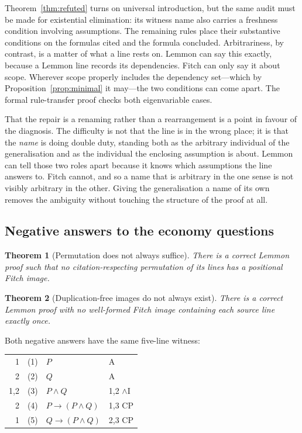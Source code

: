 \documentclass[11pt]{article}
\makeatletter
\theoremstyle{plain}
\newtheorem{theorem}{Theorem}
\theoremstyle{definition}
\theoremstyle{remark}
\newcommand{\dep}[1]{\textup{#1}}
\newenvironment{lemmonproof}
  {\begin{center}\begin{tabular}{@{}r@{\hspace{1.5em}}r@{\hspace{0.6em}}l@{\hspace{2.5em}}l@{}}}
  {\end{tabular}\end{center}}
\makeatother
\begin{document}
Theorem~\ref{thm:refuted} turns on universal introduction, but the same audit
must be made for existential elimination: its witness name also carries a
freshness condition involving assumptions. The remaining rules place their
substantive conditions on the formulas cited and the formula concluded.
Arbitrariness, by contrast, is a matter of what a line rests on. Lemmon can
say this exactly, because a Lemmon line records its dependencies. Fitch can
only say it about scope. Wherever scope properly includes the dependency
set---which by Proposition~\ref{prop:minimal} it may---the two conditions can
come apart. The formal rule-transfer proof checks both eigenvariable cases.

That the repair is a renaming rather than a rearrangement is a point in
favour of the diagnosis. The difficulty is not that the line is in the wrong
place; it is that the \emph{name} is doing double duty, standing both as the
arbitrary individual of the generalisation and as the individual the enclosing
assumption is about. Lemmon can tell those two roles apart because it knows
which assumptions the line answers to. Fitch cannot, and so a name that is
arbitrary in the one sense is not visibly arbitrary in the other. Giving the
generalisation a name of its own removes the ambiguity without touching the
structure of the proof at all.

\subsection{Negative answers to the economy questions}

\begin{theorem}[Permutation does not always suffice]\label{conj:reorder}
There is a correct Lemmon proof such that no citation-respecting permutation
of its lines has a positional Fitch image.
\end{theorem}

\begin{theorem}[Duplication-free images do not always exist]
\label{conj:noduplication}
There is a correct Lemmon proof with no well-formed Fitch image containing
each source line exactly once.
\end{theorem}

Both negative answers have the same five-line witness:

\begin{lemmonproof}
\dep{1}   & (1) & $P$                         & A \\
\dep{2}   & (2) & $Q$                         & A \\
\dep{1,2} & (3) & $P \wedge Q$                & 1,2 $\wedge$I \\
\dep{2}   & (4) & $P \to (P \wedge Q)$        & 1,3 CP \\
\dep{1}   & (5) & $Q \to (P \wedge Q)$        & 2,3 CP \\
\end{lemmonproof}
\end{document}
